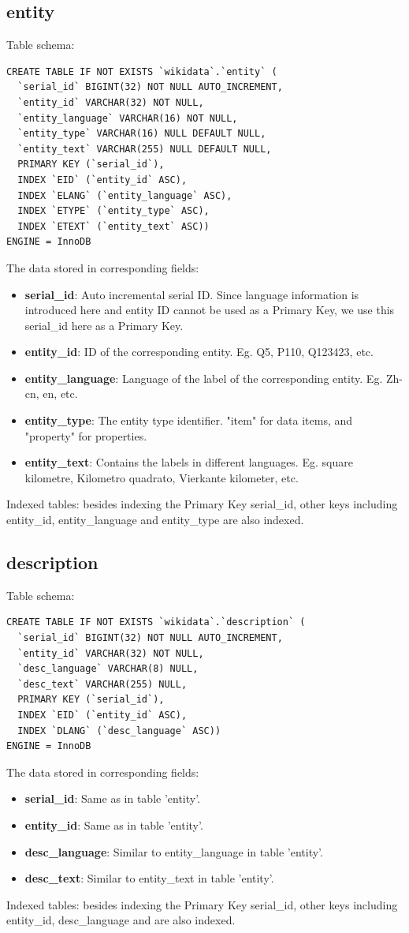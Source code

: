 \documentclass[12pt]{article}
\begin{document}
\subsection{entity}
Table schema:
\lstset{language=SQL}
\begin{lstlisting}
CREATE TABLE IF NOT EXISTS `wikidata`.`entity` (
  `serial_id` BIGINT(32) NOT NULL AUTO_INCREMENT,
  `entity_id` VARCHAR(32) NOT NULL,
  `entity_language` VARCHAR(16) NOT NULL,
  `entity_type` VARCHAR(16) NULL DEFAULT NULL,
  `entity_text` VARCHAR(255) NULL DEFAULT NULL,
  PRIMARY KEY (`serial_id`),
  INDEX `EID` (`entity_id` ASC),
  INDEX `ELANG` (`entity_language` ASC),
  INDEX `ETYPE` (`entity_type` ASC),
  INDEX `ETEXT` (`entity_text` ASC))
ENGINE = InnoDB
\end{lstlisting}
The data stored in corresponding fields:
\begin{itemize}
\item \textbf{serial\_id}: Auto incremental serial ID. Since language information is introduced here and entity ID cannot be used as a Primary Key, we use this serial\_id here as a Primary Key.
\item \textbf{entity\_id}: ID of the corresponding entity. Eg. Q5, P110, Q123423, etc.
\item \textbf{entity\_language}: Language of the label of the corresponding entity. Eg. Zh-cn, en, etc.
\item \textbf{entity\_type}: The entity type identifier. "item" for data items, and "property" for properties.
\item \textbf{entity\_text}: Contains the labels in different languages. Eg. square kilometre, Kilometro quadrato, Vierkante kilometer, etc.
\end{itemize}
Indexed tables: besides indexing the Primary Key serial\_id, other keys including entity\_id, entity\_language and entity\_type are also indexed.
\subsection{description}
\lstset{language=SQL}
Table schema:
\begin{lstlisting}
CREATE TABLE IF NOT EXISTS `wikidata`.`description` (
  `serial_id` BIGINT(32) NOT NULL AUTO_INCREMENT,
  `entity_id` VARCHAR(32) NOT NULL,
  `desc_language` VARCHAR(8) NULL,
  `desc_text` VARCHAR(255) NULL,
  PRIMARY KEY (`serial_id`),
  INDEX `EID` (`entity_id` ASC),
  INDEX `DLANG` (`desc_language` ASC))
ENGINE = InnoDB
\end{lstlisting}
The data stored in corresponding fields:
\begin{itemize}
\item \textbf{serial\_id}: Same as in table 'entity'.
\item \textbf{entity\_id}: Same as in table 'entity'.
\item \textbf{desc\_language}: Similar to entity\_language in table 'entity'.
\item \textbf{desc\_text}: Similar to entity\_text in table 'entity'.
\end{itemize}
Indexed tables: besides indexing the Primary Key serial\_id, other keys including entity\_id, desc\_language and are also indexed.
\end{document}
